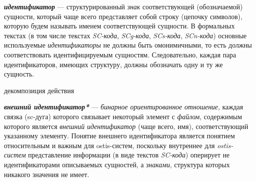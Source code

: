\textbf{\textit{идентификатор}} --- структурированный \textit{знак} соответствующей (обозначаемой) сущности, который чаще всего представляет собой строку (цепочку символов), которую будем называть именем соответствующей сущности.
В формальных текстах (в том числе текстах \textit{SC-кода}, \textit{SCg-кода}, \textit{SCs-кода}, \textit{SCn-кода}) основные используемые \textit{идентификаторы} не должны быть омонимичными, то есть должны  соответствовать идентифицируемым сущностям.
Следовательно, каждая пара идентификаторов, имеющих  структуру, должны обозначать одну и ту же сущность.

\begin{SCn}

    \begin{scnrelfromset}{декомпозиция действия}
        \begin{scnindent}
        \end{scnindent}
        \begin{scnindent}
        \end{scnindent}
    \end{scnrelfromset}

\end{SCn}

\textbf{\textit{внешний идентификатор*}} --- \textit{бинарное ориентированное отношение}, каждая связка (sc-дуга) которого связывает некоторый элемент с \textit{файлом}, содержимым которого является \textit{внешний идентификатор} (чаще всего, имя), соответствующий указанному элементу.
Понятие внешнего идентификатора является понятием относительным и важным для ostis-систем, поскольку внутреннее для \textit{ostis-систем} представление информации (в виде текстов \textit{SC-кода}) оперирует не идентификаторами описываемых сущностей, а \textit{знаками}, структура которых никакого значения не имеет.

\begin{SCn}



\end{SCn}

